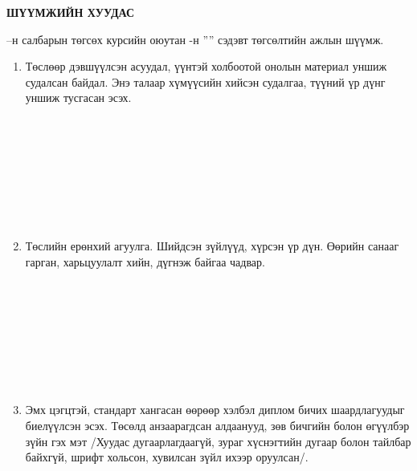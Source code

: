 \newpage

\begin{titlepage}
\begin{center}

{\scshape\Large \univname\par} %
{\scshape\large \facname\par}\vspace{1cm} %

\textbf{{\Large ШҮҮМЖИЙН ХУУДАС}}\\[1cm]

\end{center}

\normalsize

\deptname --н салбарын төгсөх курсийн оюутан \shortname -н ''\ttitle'' сэдэвт төгсөлтийн ажлын шүүмж.

\begin{enumerate}
\item Төслөөр дэвшүүлсэн асуудал, үүнтэй холбоотой онолын материал уншиж судалсан байдал. Энэ талаар хүмүүсийн хийсэн судалгаа, түүний үр дүнг уншиж тусгасан эсэх.
\begin{center}
\dotfill \\[0.1cm]
\dotfill \\[0.1cm]
\dotfill \\[0.1cm]
\dotfill \\[0.1cm]
\dotfill \\[0.1cm]
\dotfill \\[0.1cm]
\dotfill \\[0.4cm]
\end{center}
\item Төслийн ерөнхий агуулга. Шийдсэн зүйлүүд, хүрсэн үр дүн. Өөрийн санааг гарган, харьцуулалт хийн, дүгнэж байгаа чадвар.
\begin{center}
\dotfill \\[0.1cm]
\dotfill \\[0.1cm]
\dotfill \\[0.1cm]
\dotfill \\[0.1cm]
\dotfill \\[0.1cm]
\dotfill \\[0.1cm]
\dotfill \\[0.4cm]
\end{center}
\item Эмх цэгцтэй, стандарт хангасан өөрөөр хэлбэл диплом бичих шаардлагуудыг биелүүлсэн эсэх. Төсөлд анзаарагдсан алдаанууд, зөв бичгийн болон өгүүлбэр зүйн гэх мэт /Хуудас дугаарлагдаагүй, зураг хүснэгтийн дугаар болон тайлбар байхгүй, шрифт хольсон, хувилсан зүйл ихээр оруулсан/.
\begin{center}
\dotfill \\[0.1cm]
\dotfill \\[0.1cm]
\dotfill \\[0.1cm]
\dotfill \\[0.1cm]
\dotfill \\[0.1cm]
\end{center}
\end{enumerate}
\end{titlepage}


